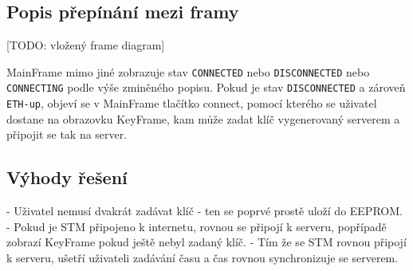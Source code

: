 \subsection{Popis přepínání mezi framy}
[TODO: vložený frame diagram]

MainFrame mimo jiné zobrazuje stav \texttt{CONNECTED} nebo \texttt{DISCONNECTED} nebo \texttt{CONNECTING}
podle výše zminěného popisu.
Pokud je stav \texttt{DISCONNECTED} a zároveň \texttt{ETH-up}, objeví se v MainFrame tlačítko connect,
pomocí kterého se uživatel dostane na obrazovku KeyFrame, kam může zadat klíč vygenerovaný serverem a
připojit se tak na server.

\subsection{Výhody řešení}
- Uživatel nemusí dvakrát zadávat klíč - ten se poprvé prostě uloží do EEPROM.
- Pokud je STM připojeno k internetu, rovnou se připojí k serveru, popřípadě zobrazí KeyFrame pokud
  ještě nebyl zadaný klíč.
  - Tím že se STM rovnou připojí k serveru, ušetří uživateli zadávání času a čas rovnou synchronizuje
    se serverem.
